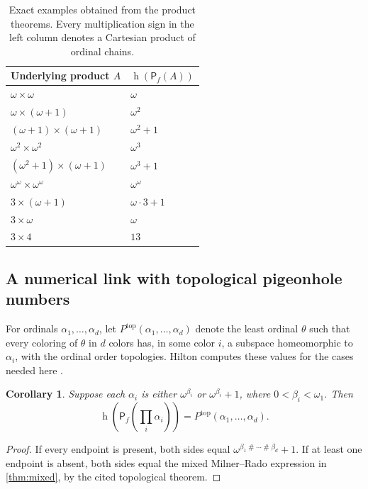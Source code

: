 \documentclass[11pt,letterpaper]{article}
\theoremstyle{teal}
\newtheorem{corollary}[theorem]{Corollary}
\theoremstyle{definition}
\newcommand{\Pf}{\mathsf P_{\!f}}
\newcommand{\hgt}{\operatorname{h}}
\newcommand{\nsum}{\mathbin{\#}}
\begin{document}
\begin{table}[htbp]
\centering
\renewcommand{\arraystretch}{1.22}
\begin{tabular}{@{}ll@{}}
\toprule
Underlying product $A$ & $\hgt(\Pf(A))$\\
\midrule
$\omega\times\omega$ & $\omega$\\
$\omega\times(\omega+1)$ & $\omega^2$\\
$(\omega+1)\times(\omega+1)$ & $\omega^2+1$\\
$\omega^2\times\omega^2$ & $\omega^3$\\
$(\omega^2+1)\times(\omega+1)$ & $\omega^3+1$\\
$\omega^\omega\times\omega^\omega$ & $\omega^\omega$\\
$3\times(\omega+1)$ & $\omega\cdot3+1$\\
$3\times\omega$ & $\omega$\\
$3\times4$ & $13$\\
\bottomrule
\end{tabular}
\caption{Exact examples obtained from the product theorems. Every multiplication sign in the left column denotes a Cartesian product of ordinal chains.}
\label{tab:products}
\end{table}

\subsection{A numerical link with topological pigeonhole numbers}
For ordinals $\alpha_1,\ldots,\alpha_d$, let $P^{\mathrm{top}}(\alpha_1,\ldots,\alpha_d)$ denote the least ordinal $\theta$ such that every coloring of $\theta$ in $d$ colors has, in some color $i$, a subspace homeomorphic to $\alpha_i$, with the ordinal order topologies. Hilton computes these values for the cases needed here \cite[Theorems~1.1 and~4.7]{Hilton}.

\begin{corollary}\label{cor:pigeonhole}
Suppose each $\alpha_i$ is either $\omega^{\beta_i}$ or $\omega^{\beta_i}+1$, where $0<\beta_i<\omega_1$. Then
\[
 \hgt\!\left(\Pf\!\left(\prod_i\alpha_i\right)\right)
 =P^{\mathrm{top}}(\alpha_1,\ldots,\alpha_d).
\]
\end{corollary}
\begin{proof}
If every endpoint is present, both sides equal $\omega^{\beta_1\nsum\cdots\nsum\beta_d}+1$. If at least one endpoint is absent, both sides equal the mixed Milner--Rado expression in \cref{thm:mixed}, by the cited topological theorem.
\end{proof}
\end{document}
